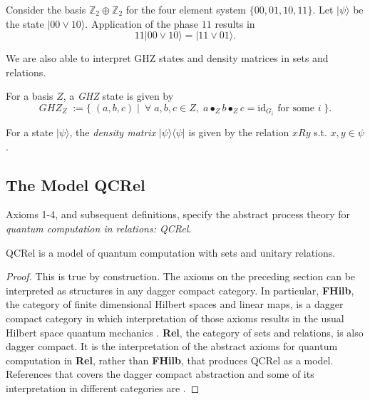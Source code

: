 \begin{example}
Consider the basis $\mathbb{Z}_2\oplus\mathbb{Z}_2$ for the four element system $\{00,01,10,11\}$.  Let $|\psi\rangle$ be the state $|00\vee10\rangle$. Application of the phase $11$ results in
\[ 11|00\vee10\rangle = |11\vee01\rangle . \]
\end{example}

We are also able to interpret GHZ states and density matrices in sets and relations.

\begin{defn}
For a basis $Z$, a \emph{GHZ} state is given by
\[ GHZ_Z \; := \{\;(a,b,c)\;|\;\ \forall \;a,b,c \in Z,\;a\bullet_Zb\bullet_Zc = \mbox{id}_{G_i}\mbox{ for some } i\;\}.  \]
\end{defn}

\begin{defn}
For a state $|\psi\rangle$, the \emph{density matrix} $|\psi\rangle\langle\psi|$ is given by the relation $xRy$ s.t. $x,y\in \psi$.
\end{defn}

\subsection{The Model QCRel}

\begin{defn}
Axioms 1-4, and subsequent definitions, specify the abstract process theory for \emph{quantum computation in relations: QCRel}.
\end{defn}

\begin{theorem}
QCRel is a model of quantum computation with sets and unitary relations.
\end{theorem}
\begin{proof}
This is true by construction.  The axioms on the preceding section can be interpreted as structures in any dagger compact category. In particular, {\bf FHilb}, the category of finite dimensional Hilbert spaces and linear maps,  is a dagger compact category in which interpretation of those axioms results in the usual Hilbert space quantum mechanics \cite{abramsky2008categorical}.  {\bf Rel}, the category of sets and relations, is also dagger compact.  It is the interpretation of the abstract axioms for quantum computation in {\bf Rel}, rather than {\bf FHilb}, that produces QCRel as a model. References that covers the dagger compact abstraction and some of its interpretation in different categories are \cite{coecke2011categories,cqm-notes}.
\end{proof}

